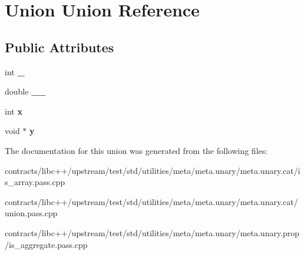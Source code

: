 \hypertarget{union_union}{}\section{Union Union Reference}
\label{union_union}
\subsection*{Public Attributes}
\begin{DoxyCompactItemize}
\item 
\mbox{\label{union_union_ae92c7cc284be0b6596dc824115ead9fd}} 
int {\bfseries \+\_\+}
\item 
\mbox{\label{union_union_a65d7ee1967d83517eb98733ffd9db174}} 
double {\bfseries \+\_\+\+\_\+}
\item 
\mbox{\label{union_union_a006bc1ff2c7877c430c89853ab81e234}} 
int {\bfseries x}
\item 
\mbox{\label{union_union_a216e6c632687564fd2ce1ed06607a552}} 
void $\ast$ {\bfseries y}
\end{DoxyCompactItemize}


The documentation for this union was generated from the following files\+:\begin{DoxyCompactItemize}
\item 
contracts/libc++/upstream/test/std/utilities/meta/meta.\+unary/meta.\+unary.\+cat/is\+\_\+array.\+pass.\+cpp\item 
contracts/libc++/upstream/test/std/utilities/meta/meta.\+unary/meta.\+unary.\+cat/union.\+pass.\+cpp\item 
contracts/libc++/upstream/test/std/utilities/meta/meta.\+unary/meta.\+unary.\+prop/is\+\_\+aggregate.\+pass.\+cpp\end{DoxyCompactItemize}
